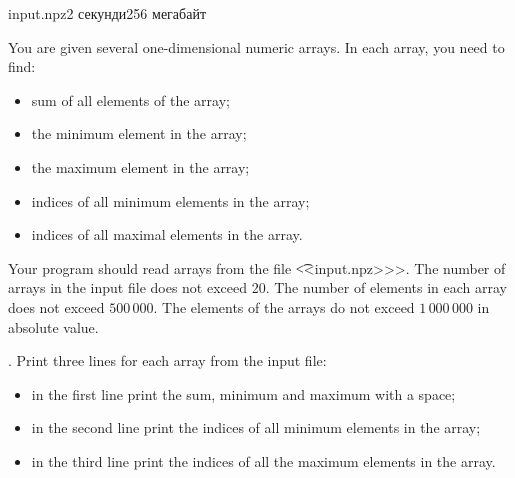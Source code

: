 \begin{problem}{}{input.npz}{}{2 секунди}{256 мегабайт}

You are given several one-dimensional numeric arrays. In each array, you need to find:
\begin{itemize} 
\item sum of all elements of the array;
\item the minimum element in the array;
\item the maximum element in the array;
\item indices of all minimum elements in the array;
\item indices of all maximal elements in the array.
\end{itemize}

\InputFile
Your program should read arrays from the file {\t {<<input.npz>>>}}.
The number of arrays in the input file does not exceed 20.
The number of elements in each array does not exceed $500\,000$.
The elements of the arrays do not exceed $1\,000\,000$ in absolute value.

\OutputFile.
Print three lines for each array from the input file:
\begin{itemize} 
\item in the first line print the sum, minimum and maximum with a space;
\item in the second line print the indices of all minimum elements in the array;
\item in the third line print the indices of all the maximum elements in the array.
\end{itemize}


\Example
\begin{example}
%
\end{example}

\end{problem}


